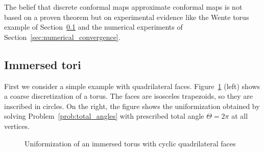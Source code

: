 \documentclass[Thesis]{subfiles}
\begin{document}
The belief that discrete conformal maps approximate conformal maps is
not based on a proven theorem but on experimental evidence like the
Wente torus example of Section~\ref{sec:immersed_tori} and the
numerical experiments of Section~\ref{sec:numerical_convergence}. 

\subsection{Immersed tori}
\label{sec:immersed_tori}



First we consider a simple example with quadrilateral faces.
Figure~\ref{fig:torus_cyclic} (left) shows a coarse discretization of
a torus.  The faces are isosceles trapezoids, so they
are inscribed in circles. On the right, the figure shows the
uniformization obtained by solving Problem~\ref{prob:total_angles}
with prescribed total angle $\Theta=2\pi$ at all vertices.

\begin{figure}%
  \centering
  \caption{ Uniformization of an immersed torus with cyclic quadrilateral faces}
\label{fig:torus_cyclic}
\end{figure}

\end{document}
